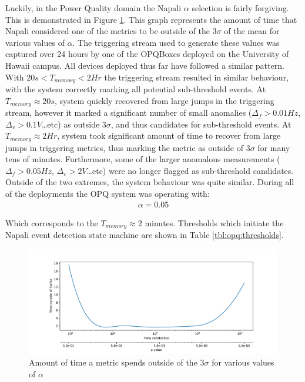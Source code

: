 Luckily, in the Power Quality domain the Napali $\alpha$ selection is fairly forgiving.
This is demonstrated in Figure \ref{fig:expdes:6}.
This graph represents the amount of time that Napali considered one of the metrics to be outside of the $3\sigma$ of the mean for various values of $\alpha$.
The triggering stream used to generate these values was captured over 24 hours by one of the OPQBoxes deployed on the University of Hawaii campus.
All devices deployed thus far have followed a similar pattern.
With $20s <T_{memory} < 2Hr$ the triggering stream resulted in similar behaviour, with the system correctly marking all potential sub-threshold events.
At $T_{memory} \approx 20s$, system quickly recovered from large jumps in the triggering stream, however it marked a significant number of small anomalies ($\Delta_{f}>0.01Hz$, $\Delta_{v}> 0.1V$\ldots etc) as outside $3\sigma$, and thus candidates for sub-threshold events.
At $T_{memory} \approx 2Hr$, system took  significant amount of time to recover from large jumps in triggering metrics, thus marking the metric as outside of $3\sigma$ for many tens of minutes.
Furthermore, some of the larger anomalous measurements ($\Delta_{f}>0.05Hz$, $\Delta_{v}> 2V$\ldots etc) were no longer flagged as sub-threshold candidates.
Outside of the two extremes, the system behaviour was quite similar.
During all of the deployments the OPQ system was operating with:
\begin{equation}\label{eq:opq_alpha}
\begin{aligned}
    \alpha = 0.05
\end{aligned}
\end{equation}

Which corresponds to the $T_{memory} \approx 2$ minutes.
Thresholds which initiate the Napali event detection state machine are shown in Table \ref{tbl:opq:thresholds}.
\begin{figure}[ht!]
    \centering
    \includegraphics[width=1\linewidth]{img/napali_eval/a_selection.pdf}
    \caption{Amount of time a metric spends outside of the $3\sigma$ for various values of $\alpha$}
    \label{fig:expdes:6}
\end{figure}


